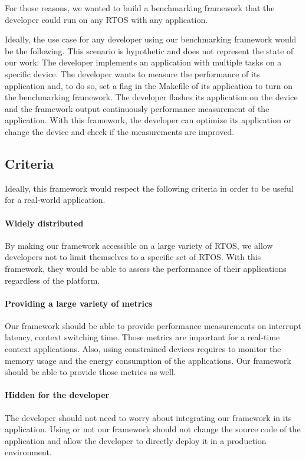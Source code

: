For those reasons, we wanted to build a benchmarking framework that the developer could run on any RTOS with any application.

Ideally, the use case for any developer using our benchmarking framework would be the following.
This scenario is hypothetic and does not represent the state of our work.
The developer implements an application with multiple tasks on a specific device.
The developer wants to measure the performance of its application and, to do so, set a flag in the Makefile of its application to turn on the benchmarking framework.
The developer flashes its application on the device and the framework output continuously performance measurement of the application.
With this framework, the developer can optimize its application or change the device and check if the measurements are improved.

\subsection{Criteria}

Ideally, this framework would respect the following criteria in order to be useful for a real-world application.

\paragraph{Widely distributed}
By making our framework accessible on a large variety of RTOS, we allow developers not to limit themselves to a specific set of RTOS.
With this framework, they would be able to assess the performance of their applications regardless of the platform.

\paragraph{Providing a large variety of metrics}
Our framework should be able to provide performance measurements on interrupt latency, context switching time.
Those metrics are important for a real-time context applications.
Also, using constrained devices requires to monitor the memory usage and the energy consumption of the applications.
Our framework should be able to provide those metrics as well.

\paragraph{Hidden for the developer}
The developer should not need to worry about integrating our framework in its application.
Using or not our framework should not change the source code of the application and allow the developer to directly deploy it in a production environment.


